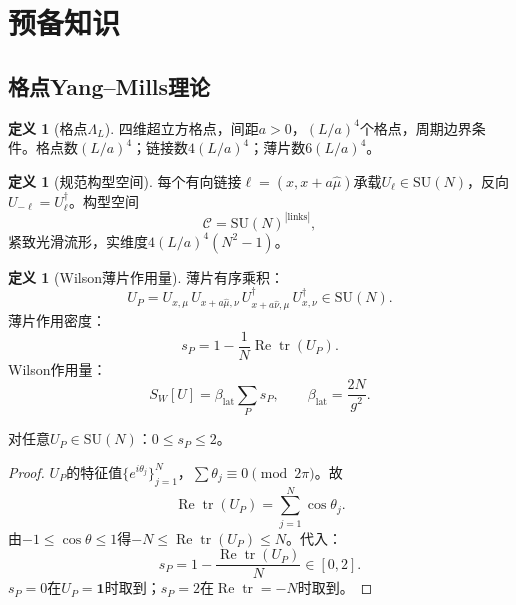 \documentclass[12pt,a4paper]{article}
\theoremstyle{plain}
\theoremstyle{definition}\newtheorem{definition}[theorem]{定义}
\theoremstyle{remark}\newtheorem{remark}[theorem]{注记}
\begin{document}
\section{预备知识}\label{sec:prelim}

\subsection{格点Yang--Mills理论}\label{sec:lattice}

\begin{definition}[格点$\Lambda_L$]\label{def:lattice}
四维超立方格点，间距$a>0$，$(L/a)^4$个格点，周期边界条件。格点数$(L/a)^4$；链接数$4(L/a)^4$；薄片数$6(L/a)^4$。
\end{definition}

\begin{definition}[规范构型空间]\label{def:config}
每个有向链接$\ell=(x,x+a\hat\mu)$承载$U_\ell\in\mathrm{SU}(N)$，反向$U_{-\ell}=U_\ell^\dagger$。构型空间
\begin{equation}\label{eq:config}
\mathcal{C} = \mathrm{SU}(N)^{|\mathrm{links}|},
\end{equation}
紧致光滑流形，实维度$4(L/a)^4(N^2-1)$。
\end{definition}

\begin{definition}[Wilson薄片作用量]\label{def:wilson}
薄片有序乘积：
\begin{equation}\label{eq:UP}
U_P = U_{x,\mu}\,U_{x+a\hat\mu,\nu}\,U_{x+a\hat\nu,\mu}^\dagger\,U_{x,\nu}^\dagger \in \mathrm{SU}(N).
\end{equation}
薄片作用密度：
\begin{equation}\label{eq:sp}
s_P = 1 - \frac{1}{N}\operatorname{Re}\operatorname{tr}(U_P).
\end{equation}
Wilson作用量：
\begin{equation}\label{eq:SW}
S_W[U] = \beta_{\mathrm{lat}}\sum_P s_P, \qquad \beta_{\mathrm{lat}} = \frac{2N}{g^2}.
\end{equation}
\end{definition}

\begin{lemma}[$s_P$的界]\label{lem:sp}
对任意$U_P\in\mathrm{SU}(N)$：$0\leq s_P\leq 2$。
\end{lemma}

\begin{proof}
$U_P$的特征值$\{e^{i\theta_j}\}_{j=1}^N$，$\sum\theta_j\equiv 0\pmod{2\pi}$。故
\begin{equation}
\operatorname{Re}\operatorname{tr}(U_P) = \sum_{j=1}^N \cos\theta_j.
\end{equation}
由$-1\leq\cos\theta\leq 1$得$-N\leq\operatorname{Re}\operatorname{tr}(U_P)\leq N$。代入：
\begin{equation}
s_P = 1 - \frac{\operatorname{Re}\operatorname{tr}(U_P)}{N} \in [0,2].
\end{equation}
$s_P=0$在$U_P=\mathbf{1}$时取到；$s_P=2$在$\operatorname{Re}\operatorname{tr}=-N$时取到。
\end{proof}
\end{document}
